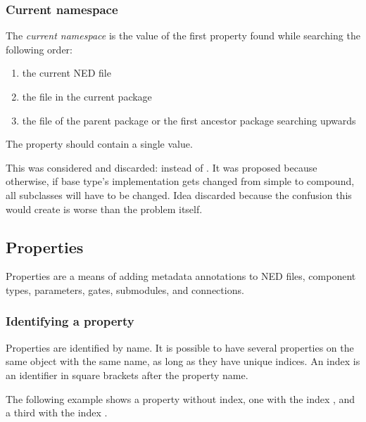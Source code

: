\subsubsection{Current namespace}
\label{cha:ned-ref:current-namespace}

The \textit{current namespace} is the value of the first 
property found while searching the following order:
\begin{enumerate}
  \item the current NED file
  \item the  file in the current package
  \item the  file of the parent package or the first ancestor
        package searching upwards
\end{enumerate}

The  property should contain a single value.

\begin{note}
    This was considered and discarded: 
    instead of . It was proposed because
    otherwise, if base type's implementation gets changed from simple to compound, all
    subclasses will have to be changed. Idea discarded because the confusion
    this would create is worse than the problem itself.
\end{note}



\subsection{Properties}
\label{ch-ned-ref:sec:properties}

Properties are a means of adding metadata annotations to NED files, component types,
parameters, gates, submodules, and connections.

\subsubsection{Identifying a property}

Properties are identified by name. It is possible to have several properties
on the same object with the same name, as long as they have unique indices.
An index is an identifier in square brackets after the property name.

The following example shows a property without index, one with the index ,
and a third with the index .

